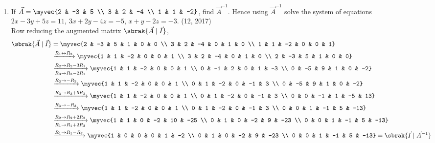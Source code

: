 \begin{enumerate}[label=\thesubsection.\arabic*, ref=\thesubsection.\theenumi]
\item 
If $\vec{A} = \myvec{2 & -3 & 5 \\ 3 & 2 & -4 \\ 1 & 1 & -2}$, find $\vec{A}^{-1}$. Hence using $\vec{A}^{-1}$ solve the system of equations $2x - 3y + 5z = 11$, $3x + 2y - 4z = -5$, $x + y - 2z = -3$.
\hfill (12, 2017)
\\
\solution
Row reducing the augmented matrix $\sbrak{\vec{A} \mid \vec{I}}$,
{\small
\setlength{\arraycolsep}{2.5pt}
\begin{align}
	\sbrak{\vec{A} \mid \vec{I}} &= \myvec{2 & -3 & 5 & 1 & 0 & 0 \\ 3 & 2 & -4 & 0 & 1 & 0 \\ 1 & 1 & -2 & 0 & 0 & 1}
	\nonumber \\
	&\xrightarrow{R_1 \leftrightarrow R_3}
	\myvec{1 & 1 & -2 & 0 & 0 & 1 \\ 3 & 2 & -4 & 0 & 1 & 0 \\ 2 & -3 & 5 & 1 & 0 & 0}
	\nonumber \\
	&\xrightarrow[R_3 \to R_3 - 2R_1]{R_2 \to R_2 - 3R_1}
	\myvec{1 & 1 & -2 & 0 & 0 & 1 \\ 0 & -1 & 2 & 0 & 1 & -3 \\ 0 & -5 & 9 & 1 & 0 & -2}
	\nonumber \\
	&\xrightarrow{R_2 \to -R_2}
	\myvec{1 & 1 & -2 & 0 & 0 & 1 \\ 0 & 1 & -2 & 0 & -1 & 3 \\ 0 & -5 & 9 & 1 & 0 & -2}
	\nonumber \\
	&\xrightarrow{R_3 \to R_3 + 5R_2}
	\myvec{1 & 1 & -2 & 0 & 0 & 1 \\ 0 & 1 & -2 & 0 & -1 & 3 \\ 0 & 0 & -1 & 1 & -5 & 13}
	\nonumber \\
	&\xrightarrow{R_3 \to -R_3}
	\myvec{1 & 1 & -2 & 0 & 0 & 1 \\ 0 & 1 & -2 & 0 & -1 & 3 \\ 0 & 0 & 1 & -1 & 5 & -13}
	\nonumber \\
	&\xrightarrow[R_1 \to R_1 + 2R_3]{R_2 \to R_2 + 2R_3}
	\myvec{1 & 1 & 0 & -2 & 10 & -25 \\ 0 & 1 & 0 & -2 & 9 & -23 \\ 0 & 0 & 1 & -1 & 5 & -13}
	\nonumber \\
	&\xrightarrow{R_1 \to R_1 - R_2}
	\myvec{1 & 0 & 0 & 0 & 1 & -2 \\ 0 & 1 & 0 & -2 & 9 & -23 \\ 0 & 0 & 1 & -1 & 5 & -13}
	= \sbrak{\vec{I} \mid \vec{A}^{-1}}

\end{align}}
\end{enumerate}
